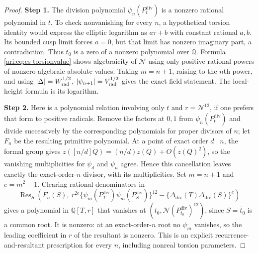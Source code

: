 \begin{proof}
\noindent\textbf{Step 1.} The division polynomial $\psi_n(P^{\mathrm{div}}_t)$ is a nonzero rational
polynomial in $t$. To check nonvanishing for every $n$, a hypothetical
torsion identity would express the elliptic logarithm as
$a\tau+b$ with constant rational $a,b$. Its bounded cusp limit
forces $a=0$, but that limit has nonzero imaginary part, a
contradiction. Thus $t_0$ is a zero of a nonzero polynomial over
$\mathbb Q$. Formula \eqref{ari:eq:cs-torsionvalue} shows algebraicity
of $\mathcal N$ using only positive rational powers of nonzero algebraic
absolute values. Taking $m=n+1$, raising to the $n$th power, and
using $|\Delta|=W_{\rm rad}^{1/2}$, $|\psi_{n+1}|=V_{\rm rad}^{1/2}$ gives the exact
field statement. The local-height formula is its logarithm.


\noindent\textbf{Step 2.} Here is a polynomial relation involving only $t$ and $r=\mathcal N^{12}$,
if one prefers that form to positive radicals. Remove the factors
at $0,1$ from $\psi_n(P^{\mathrm{div}}_t)$ and divide successively by the
corresponding polynomials for proper divisors of $n$; let $F_n$ be
the resulting primitive polynomial. At a point of exact order
$d\mid n$, the formal group gives
$z([n/d]Q)=(n/d)z(Q)+O(z(Q)^2)$, so the vanishing multiplicities for
$\psi_d$ and $\psi_n$ agree. Hence this cancellation leaves exactly
the exact-order-$n$ divisor, with its multiplicities. Set
$m=n+1$ and $e=m^2-1$. Clearing rational denominators in
\[
 \operatorname{Res}_S\left(
 F_n(S),\
 r^{2e}\{\psi_m(P^{\mathrm{div}}_T)\psi_m(P^{\mathrm{div}}_S)\}^{12}
              -\{\Delta_{\mathrm{div}}(T)\Delta_{\mathrm{div}}(S)\}^{e}\right)
\]
gives a polynomial in $\mathbb Q[T,r]$ that vanishes at
$(t_0,\mathcal N(P^{\mathrm{div}}_{t_0})^{12})$, since $S=\bar t_0$ is a common root.
It is nonzero: at an exact-order-$n$ root no $\psi_m$ vanishes,
so the leading coefficient in $r$ of the resultant is nonzero.
This is an explicit recurrence-and-resultant prescription for
every $n$, including nonreal torsion parameters.
\end{proof}

